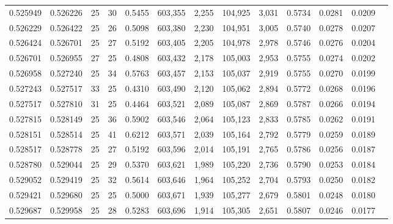 \begin{tabular}{rrrrrrrrrrrrr}
0.525949 & 0.526226 &    25 &  30 &                                     0.5455 & 603,355 &   2,255 & 104,925 &   3,031 & 0.5734 & 0.0281 & 0.0209 \\
0.526229 & 0.526422 &    25 &  26 &                                     0.5098 & 603,380 &   2,230 & 104,951 &   3,005 & 0.5740 & 0.0278 & 0.0207 \\
0.526424 & 0.526701 &    25 &  27 &                                     0.5192 & 603,405 &   2,205 & 104,978 &   2,978 & 0.5746 & 0.0276 & 0.0204 \\
0.526701 & 0.526955 &    27 &  25 &                                     0.4808 & 603,432 &   2,178 & 105,003 &   2,953 & 0.5755 & 0.0274 & 0.0202 \\
0.526958 & 0.527240 &    25 &  34 &                                     0.5763 & 603,457 &   2,153 & 105,037 &   2,919 & 0.5755 & 0.0270 & 0.0199 \\
0.527243 & 0.527517 &    33 &  25 &                                     0.4310 & 603,490 &   2,120 & 105,062 &   2,894 & 0.5772 & 0.0268 & 0.0196 \\
0.527517 & 0.527810 &    31 &  25 &                                     0.4464 & 603,521 &   2,089 & 105,087 &   2,869 & 0.5787 & 0.0266 & 0.0194 \\
0.527815 & 0.528149 &    25 &  36 &                                     0.5902 & 603,546 &   2,064 & 105,123 &   2,833 & 0.5785 & 0.0262 & 0.0191 \\
0.528151 & 0.528514 &    25 &  41 &                                     0.6212 & 603,571 &   2,039 & 105,164 &   2,792 & 0.5779 & 0.0259 & 0.0189 \\
0.528517 & 0.528778 &    25 &  27 &                                     0.5192 & 603,596 &   2,014 & 105,191 &   2,765 & 0.5786 & 0.0256 & 0.0187 \\
0.528780 & 0.529044 &    25 &  29 &                                     0.5370 & 603,621 &   1,989 & 105,220 &   2,736 & 0.5790 & 0.0253 & 0.0184 \\
0.529052 & 0.529419 &    25 &  32 &                                     0.5614 & 603,646 &   1,964 & 105,252 &   2,704 & 0.5793 & 0.0250 & 0.0182 \\
0.529421 & 0.529680 &    25 &  25 &                                     0.5000 & 603,671 &   1,939 & 105,277 &   2,679 & 0.5801 & 0.0248 & 0.0180 \\
0.529687 & 0.529958 &    25 &  28 &                                     0.5283 & 603,696 &   1,914 & 105,305 &   2,651 & 0.5807 & 0.0246 & 0.0177 \\

\end{tabular}
